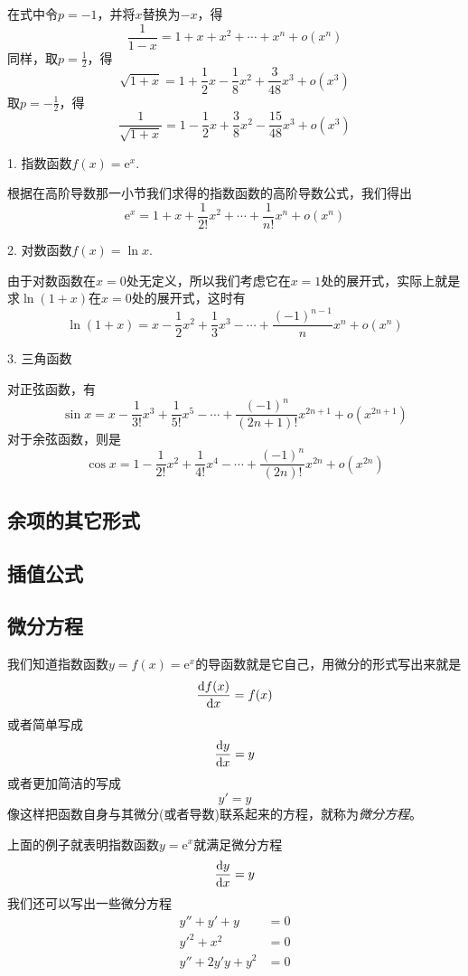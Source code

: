 在式中令$p=-1$，并将$x$替换为$-x$，得
\[ \frac{1}{1-x} = 1+x+x^2 + \cdots + x^n + o(x^n) \]
同样，取$p=\frac{1}{2}$，得
\[ \sqrt{1+x} = 1+\frac{1}{2}x-\frac{1}{8}x^2+\frac{3}{48}x^3 + o(x^3) \]
取$p=-\frac{1}{2}$，得
\[ \frac{1}{\sqrt{1+x}} = 1-\frac{1}{2}x+\frac{3}{8}x^2 -\frac{15}{48}x^3 + o(x^3) \]

1. 指数函数$f(x)=\mathrm{e}^x$.

根据在高阶导数那一小节我们求得的指数函数的高阶导数公式，我们得出
\[ \mathrm{e}^x = 1+x+\frac{1}{2!}x^2 + \cdots + \frac{1}{n!}x^n + o(x^n) \]

2. 对数函数$f(x)=\ln{x}$.

由于对数函数在$x=0$处无定义，所以我们考虑它在$x=1$处的展开式，实际上就是求$\ln{(1+x)}$在$x=0$处的展开式，这时有
\[ \ln{(1+x)} = x - \frac{1}{2} x^2 + \frac{1}{3} x^3 - \cdots + \frac{(-1)^{n-1}}{n}x^n + o(x^n) \]

3. 三角函数

对正弦函数，有
\[ \sin{x} = x - \frac{1}{3!}x^3 + \frac{1}{5!} x^5 - \cdots + \frac{(-1)^n}{(2n+1)!}x^{2n+1} + o(x^{2n+1}) \]
对于余弦函数，则是
\[ \cos{x} = 1 - \frac{1}{2!}x^2 + \frac{1}{4!}x^4 - \cdots + \frac{(-1)^n}{(2n)!}x^{2n} + o(x^{2n}) \]

\subsection{余项的其它形式}
\label{sec:other-format-of-taylor-additional}



\subsection{插值公式}
\label{sec:interpolation-formula}


\subsection{微分方程}
\label{sec:differtial-equation}

我们知道指数函数$y=f(x)=\mathrm{e}^x$的导函数就是它自己，用微分的形式写出来就是
\[ \frac{\mathop{}\!\mathrm{d} f(x)}{\mathop{}\!\mathrm{d} x} = f(x) \]
或者简单写成
\[ \frac{\mathop{}\!\mathrm{d} y}{\mathop{}\!\mathrm{d} x} = y \]
或者更加简洁的写成
\[ y'=y \]
像这样把函数自身与其微分(或者导数)联系起来的方程，就称为\emph{微分方程}。

上面的例子就表明指数函数$y=\mathrm{e}^x$就满足微分方程
\[ \frac{\mathop{}\!\mathrm{d} y}{\mathop{}\!\mathrm{d} x} = y \]
我们还可以写出一些微分方程
\begin{align*}
  y''+y'+y&=0 \\
  y'^2+x^2&=0 \\
  y''+2y'y+y^2& = 0
\end{align*}

